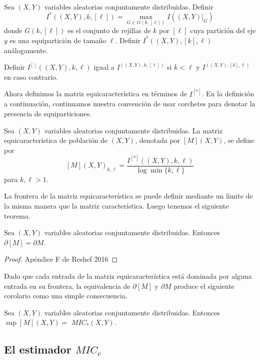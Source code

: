	\begin{defn}
		Sea $(X, Y)$ variables aleatorias conjuntamente distribuidas. Definir
		$$
		I^*((X, Y), k,[\ell])=\max _{G \in G(k,[\ell])} I\left(\left.(X, Y)\right|_G\right)
		$$
		donde $G(k,[\ell])$ es el conjunto de rejillas de $k$ por $[\ell]$ cuya partici\'on del eje $y$ es una equipartici\'on de tama\~no $\ell$. Definir $I^*((X, Y),[k], \ell)$ an\'alogamente.

		Definir $I^{[]}((X, Y), k, \ell)$ igual a $I^((X, Y), k,[\ell])$ si $k<\ell$ y $I^((X, Y),[k], \ell)$ en caso contrario.
	\end{defn}

	Ahora definimos la matriz equicaracter\'istica en t\'erminos de $I^{[*]}$. En la definici\'on a continuaci\'on, continuamos nuestra convenci\'on de usar corchetes para denotar la presencia de equiparticiones.

	\begin{defn}
		Sea $(X, Y)$ variables aleatorias conjuntamente distribuidas. La matriz equicaracter\'istica de poblaci\'on de $(X, Y)$, denotada por $[M](X, Y)$, se define por
		$$
		[M](X, Y)_{k, \ell}=\frac{I^{[*]}((X, Y), k, \ell)}{\log \min \{k, \ell\}}
		$$
		para $k, \ell>1$.
	\end{defn}

	La frontera de la matriz equicaracter\'istica se puede definir mediante un l\'imite de la misma manera que la matriz caracter\'istica. Luego tenemos el siguiente teorema.

	\begin{thm}
		Sea $(X, Y)$ variables aleatorias conjuntamente distribuidas. Entonces $\partial[M]=\partial M$.
	\end{thm}
	\begin{proof}
		Ap\'endice F de Reshef 2016
	\end{proof}

	Dado que cada entrada de la matriz equicaracter\'istica est\'a dominada por alguna entrada en su frontera, la equivalencia de $\partial[M]$ y $\partial M$ produce el siguiente corolario como una simple consecuencia.

	\begin{cor}
		Sea $(X, Y)$ variables aleatorias conjuntamente distribuidas. Entonces $\sup [M](X, Y)=$ $M I C_*(X, Y)$.
	\end{cor}

	\subsection[short]{El estimador $MIC_e$}

